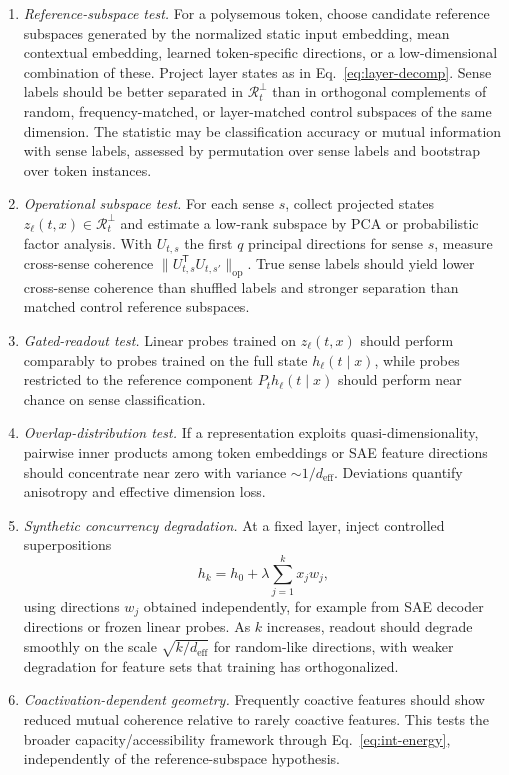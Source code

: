 \documentclass[
  aps,
  reprint,
  superscriptaddress,
  floatfix,
  nofootinbib,
  longbibliography
]{revtex4-2}
\newcommand{\deff}{d_{\mathrm{eff}}}
\newcommand{\T}{^{\mathsf{T}}}
\newcommand{\opnorm}[1]{\lVert #1 \rVert_{\mathrm{op}}}
\begin{document}
\begin{enumerate}
\item \emph{Reference-subspace test.}
For a polysemous token, choose candidate reference subspaces generated
by the normalized static input embedding, mean contextual embedding,
learned token-specific directions, or a low-dimensional combination of
these. Project layer states as in Eq.~\eqref{eq:layer-decomp}. Sense labels
should be better separated in $\mathcal R_t^\perp$ than in orthogonal
complements of random, frequency-matched, or layer-matched control
subspaces of the same dimension. The statistic may be classification accuracy or
mutual information with sense labels, assessed by permutation over
sense labels and bootstrap over token instances.

\item \emph{Operational subspace test.}
For each sense $s$, collect projected states
$z_\ell(t,x)\in\mathcal R_t^\perp$ and estimate a low-rank subspace by PCA or
probabilistic factor analysis. With $U_{t,s}$ the first $q$ principal
directions for sense $s$, measure cross-sense coherence
$\opnorm{U_{t,s}\T U_{t,s'}}$. True sense labels should yield lower
cross-sense coherence than shuffled labels and stronger separation than
matched control reference subspaces.

\item \emph{Gated-readout test.}
Linear probes trained on $z_\ell(t,x)$ should perform comparably to
probes trained on the full state $h_\ell(t\mid x)$, while probes
restricted to the reference component $P_t h_\ell(t\mid x)$ should perform
near chance on sense classification.

\item \emph{Overlap-distribution test.}
If a representation exploits quasi-dimensionality, pairwise inner
products among token embeddings or SAE feature directions should
concentrate near zero with variance $\sim1/\deff$. Deviations quantify
anisotropy and effective dimension loss.

\item \emph{Synthetic concurrency degradation.}
At a fixed layer, inject controlled superpositions
%
\begin{equation}
h_k=h_0+\lambda\sum_{j=1}^k x_j w_j,
\end{equation}
%
using directions $w_j$ obtained independently, for example from SAE
decoder directions or frozen linear probes. As $k$ increases, readout
should degrade smoothly on the scale $\sqrt{k/\deff}$ for random-like
directions, with weaker degradation for feature sets that training has
orthogonalized.

\item \emph{Coactivation-dependent geometry.}
Frequently coactive features should show reduced mutual coherence
relative to rarely coactive features. This tests the broader
capacity/accessibility framework through Eq.~\eqref{eq:int-energy},
independently of the reference-subspace hypothesis.
\end{enumerate}
\end{document}
